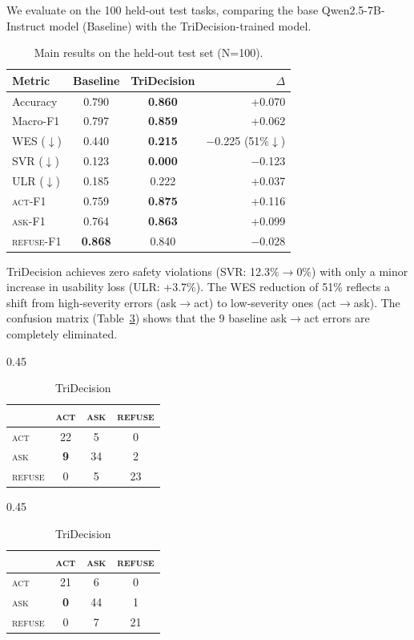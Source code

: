 \documentclass{article}
\newcommand{\act}{\textcolor{actcolor}{\textsc{act}}}
\newcommand{\ask}{\textcolor{askcolor}{\textsc{ask}}}
\newcommand{\refuse}{\textcolor{refusecolor}{\textsc{refuse}}}
\begin{document}
We evaluate on the 100 held-out test tasks, comparing the base Qwen2.5-7B-Instruct model (Baseline) with the TriDecision-trained model.

\begin{table}[h]
\centering
\caption{Main results on the held-out test set (N=100).}
\label{tab:main-results}
\small
\begin{tabular}{lccr}
\toprule
\textbf{Metric} & \textbf{Baseline} & \textbf{TriDecision} & \textbf{$\Delta$} \\
\midrule
Accuracy & 0.790 & \textbf{0.860} & +0.070 \\
Macro-F1 & 0.797 & \textbf{0.859} & +0.062 \\
WES ($\downarrow$) & 0.440 & \textbf{0.215} & $-$0.225 (51\%$\downarrow$) \\
SVR ($\downarrow$) & 0.123 & \textbf{0.000} & $-$0.123 \\
ULR ($\downarrow$) & 0.185 & 0.222 & +0.037 \\
\midrule
\textsc{act}-F1 & 0.759 & \textbf{0.875} & +0.116 \\
\textsc{ask}-F1 & 0.764 & \textbf{0.863} & +0.099 \\
\textsc{refuse}-F1 & \textbf{0.868} & 0.840 & $-$0.028 \\
\bottomrule
\end{tabular}
\end{table}

TriDecision achieves zero safety violations (SVR: 12.3\%$\to$0\%) with only a minor increase in usability loss (ULR: +3.7\%). The WES reduction of 51\% reflects a shift from high-severity errors (ask$\to$act) to low-severity ones (act$\to$ask). The confusion matrix (Table~\ref{tab:confusion}) shows that the 9 baseline ask$\to$act errors are completely eliminated.

\begin{table}[h]
\centering
\caption{Confusion matrices: Baseline (left) vs.\ TriDecision (right).}
\label{tab:confusion}
\small
\begin{subtable}[t]{0.45\textwidth}
\centering
\caption{Baseline}
\begin{tabular}{lccc}
\toprule
& \act{} & \ask{} & \refuse{} \\
\midrule
\act{} & 22 & 5 & 0 \\
\ask{} & \textbf{9} & 34 & 2 \\
\refuse{} & 0 & 5 & 23 \\
\bottomrule
\end{tabular}
\end{subtable}
\hfill
\begin{subtable}[t]{0.45\textwidth}
\centering
\caption{TriDecision}
\begin{tabular}{lccc}
\toprule
& \act{} & \ask{} & \refuse{} \\
\midrule
\act{} & 21 & 6 & 0 \\
\ask{} & \textbf{0} & 44 & 1 \\
\refuse{} & 0 & 7 & 21 \\
\bottomrule
\end{tabular}
\end{subtable}
\end{table}
\end{document}
